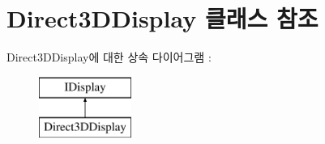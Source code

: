 \hypertarget{class_direct3_d_display}{}\section{Direct3\+D\+Display 클래스 참조}
\label{class_direct3_d_display}
Direct3\+D\+Display에 대한 상속 다이어그램 \+: \begin{figure}[H]
\begin{center}
\leavevmode
\includegraphics[height=2.000000cm]{class_direct3_d_display}
\end{center}
\end{figure}
